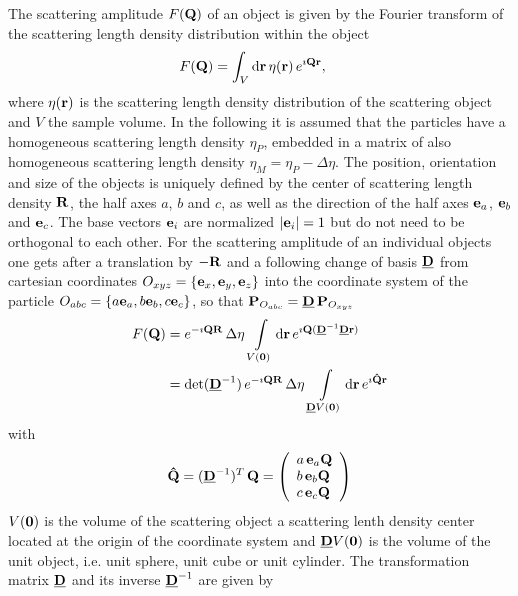The scattering amplitude $F({\bf Q})$ of an object is given by the Fourier transform of the scattering length density distribution within the object
\begin{align}
F({\bf Q}) &= \int_V \mathrm{d}{\bf r}\, \eta({\bf r})\, e^{\imath {\bf Qr}},
\end{align}
where $\eta({\bf r})$ is the scattering length density distribution of the scattering object and $V$ the sample volume.
In the following it is assumed that the particles have a homogeneous scattering length density
$\eta_P$, embedded in a matrix of also homogeneous scattering length density $\eta_M = \eta_P-\Delta\eta$.
The position, orientation and size of the objects is uniquely defined by the center of scattering length density ${\bf R}$, the half axes $a$, $b$ and $c$, as well as the direction of the half axes ${\bf e}_a$, ${\bf e}_b$ and
${\bf e}_c$. The base vectors ${\bf e}_i$ are normalized ${\left\vert{\bf e}_i\right\vert}=1$ but do not need to be orthogonal to each other.  For the scattering amplitude of an individual objects one gets after a translation by $-{\bf R}$ and a following change of basis ${\underline{\bf D}}$ from cartesian coordinates
$O_{xyz} = \{{\bf e}_x, {\bf e}_y,{\bf e}_z\}$
into the coordinate system of the particle $O_{abc}=\{a{\bf e}_a, b{\bf e}_b,
c{\bf e}_c\}$, so that ${\bf P}_{O_{abc}} = {\underline{\bf D}}\, {\bf P}_{O_{xyz}}$
\begin{align}
F({\bf Q}) &=
e^{-\imath{\bf QR}}\, \Delta\eta\,
\int\limits_{V({\bf0})} \mathrm{d}{\bf r}\, e^{\imath{\bf Q}({\underline{\bf D}}^{-1}{\underline{\bf D}}{\bf r})}\\
&=
\det({\underline{\bf D}}^{-1})\, e^{-\imath{\bf QR}}\, \Delta\eta\,
\int\limits_{{\underline{\bf D}} V({\bf0})} \mathrm{d}{\bf r}\, e^{\imath {\bf\hat{Q}}{\bf r}}
\end{align}
with
\begin{align}
\displaystyle {\bf\hat{Q}} = ({\underline{\bf D}}^{-1})^T\,{\bf Q}
= \left( \begin{array}{l} a\,{\bf e}_a{\bf Q}\\ b\,{\bf e}_b{\bf Q}\\
c\, {\bf e}_c{\bf Q}
\end{array}\right)
\label{eq:Q:dach}
\end{align}
$V({\bf0})$ is the volume of the scattering object a scattering lenth density center located at the origin of the coordinate system and ${\underline{\bf D}} V({\bf0})$ is the volume of the unit object, i.e. unit sphere, unit cube or unit cylinder.
The transformation matrix ${\underline{\bf D}}$ and its inverse ${\underline{\bf D}}^{-1}$ are given by
